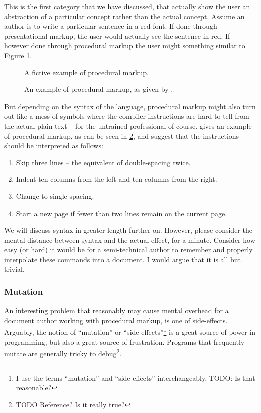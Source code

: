 \documentclass{scrreprt}
\begin{document}
This is the first category that we have discussed, that actually show the user an abstraction of a particular concept rather than the actual concept. Assume an author is to write a particular sentence in a red font. If done through presentational markup, the user would actually see the sentence in red. If however done through procedural markup the user might something similar to Figure \ref{fig:procedural-markup-red-sentence}.


\begin{figure}[h]
\centering
{}
\caption{A fictive example of procedural markup.}
\label{fig:procedural-markup-red-sentence}
\end{figure}


\begin{figure}[h]
\centering
{}
\caption{An example of procedural markup, as given by \citet{coombs}.}
\label{fig:procedural-markup-coombs}
\end{figure}



But depending on the syntax of the language, procedural markup might also turn out like a mess of symbols where the compiler instructions are hard to tell from the actual plain-text -- for the untrained professional of course. \citet{coombs} gives an example of procedural markup, as can be seen in \ref{fig:procedural-markup-coombs}, and suggest that the instructions should be interpreted as follows:

\begin{enumerate}
\item Skip three lines -- the equivalent of double-spacing twice.
\item Indent ten columns from the left and ten columns from the right.
\item Change to single-spacing.
\item Start a new page if fewer than two lines remain on the current page.
\end{enumerate}

We will discuss syntax in greater length further on. However, please consider the mental distance between syntax and the actual effect, for a minute. Consider how easy (or hard) it would be for a semi-technical author to remember and properly interpolate these commands into a document. I would argue that it is all but trivial.


\subsubsection{Mutation}
An interesting problem that reasonably may cause mental overhead for a document author working with procedural markup, is one of side-effects. Arguably, the notion of ``mutation'' or ``side-effects''\footnote{I use the terms ``mutation'' and ``side-effects'' interchangeably. TODO: Is that reasonable?} is a great source of power in programming, but also a great source of frustration. Programs that frequently mutate are generally tricky to debug\footnote{TODO Reference? Is it really true?}.
\end{document}
